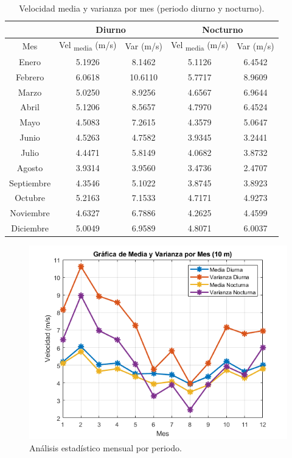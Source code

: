 \documentclass{IEEEtran}
\begin{document}
\begin{table}[h]
    \centering
    \label{tab: Velocidad media y varianza por mes (periodo diurno y nocturno)}
    \caption{Velocidad media y varianza por mes (periodo diurno y nocturno).}
    \begin{tabular}{|c|c|c|c|c|}
        \hline
        & \multicolumn{2}{|c|}{Diurno} & \multicolumn{2}{c|}{Nocturno} \\
        \hline
        Mes & Vel \textsubscript{media} (m/s) & Var (m/s) & Vel \textsubscript{media} (m/s) & Var (m/s) \\
        \hline
        Enero & 5.1926 & 8.1462 & 5.1126 & 6.4542 \\
        Febrero & 6.0618 & 10.6110 & 5.7717 & 8.9609 \\
        Marzo & 5.0250 & 8.9256 & 4.6567 & 6.9644 \\
        Abril & 5.1206 & 8.5657 & 4.7970 & 6.4524 \\
        Mayo & 4.5083 & 7.2615 & 4.3579 & 5.0647 \\
        Junio & 4.5263 & 4.7582 & 3.9345 & 3.2441 \\
        Julio & 4.4471 & 5.8149 &  4.0682 & 3.8732 \\
        Agosto & 3.9314 & 3.9560 & 3.4736 & 2.4707 \\
        Septiembre & 4.3546 & 5.1022 & 3.8745 & 3.8923 \\
        Octubre & 5.2163 & 7.1533 & 4.7171 & 4.9273 \\
        Noviembre & 4.6327 & 6.7886 & 4.2625 & 4.4599 \\
        Diciembre & 5.0049 & 6.9589 & 4.8071 & 6.0037 \\
        \hline 
    \end{tabular}
\end{table}

\begin{figure}[h]
    \centering
    \includegraphics[width = 0.5 \textwidth]{Imagenes/Grafica de Media y Varianza por Mes Periodo Diurno y Nocturno.png}
    \caption{Análisis estadístico mensual por periodo.}
    \label{fig: Analisis estadistico mensual por periodo}
\end{figure}
\end{document}
